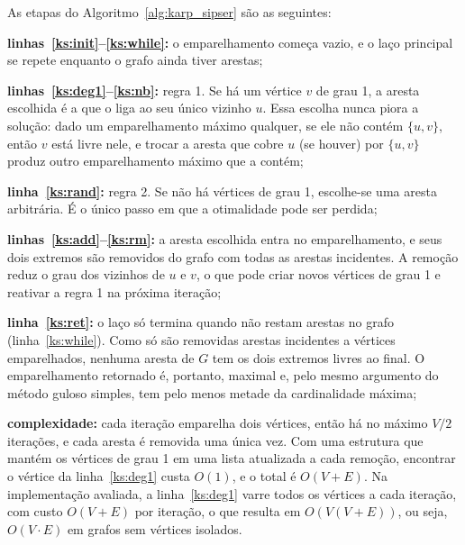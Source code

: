 As etapas do Algoritmo~\ref{alg:karp_sipser} são as seguintes:

\begin{alineas}
    \item \textbf{linhas~\ref{ks:init}--\ref{ks:while}:} o emparelhamento começa vazio, e o laço principal se repete enquanto o grafo ainda tiver arestas;
    \item \textbf{linhas~\ref{ks:deg1}--\ref{ks:nb}:} regra 1. Se há um vértice $v$ de grau 1, a aresta escolhida é a que o liga ao seu único vizinho $u$. Essa escolha nunca piora a solução: dado um emparelhamento máximo qualquer, se ele não contém $\{u, v\}$, então $v$ está livre nele, e trocar a aresta que cobre $u$ (se houver) por $\{u, v\}$ produz outro emparelhamento máximo que a contém;
    \item \textbf{linha~\ref{ks:rand}:} regra 2. Se não há vértices de grau 1, escolhe-se uma aresta arbitrária. É o único passo em que a otimalidade pode ser perdida;
    \item \textbf{linhas~\ref{ks:add}--\ref{ks:rm}:} a aresta escolhida entra no emparelhamento, e seus dois extremos são removidos do grafo com todas as arestas incidentes. A remoção reduz o grau dos vizinhos de $u$ e $v$, o que pode criar novos vértices de grau 1 e reativar a regra 1 na próxima iteração;
    \item \textbf{linha~\ref{ks:ret}:} o laço só termina quando não restam arestas no grafo (linha~\ref{ks:while}). Como só são removidas arestas incidentes a vértices emparelhados, nenhuma aresta de $G$ tem os dois extremos livres ao final. O emparelhamento retornado é, portanto, maximal e, pelo mesmo argumento do método guloso simples, tem pelo menos metade da cardinalidade máxima;
    \item \textbf{complexidade:} cada iteração emparelha dois vértices, então há no máximo $V/2$ iterações, e cada aresta é removida uma única vez. Com uma estrutura que mantém os vértices de grau 1 em uma lista atualizada a cada remoção, encontrar o vértice da linha~\ref{ks:deg1} custa $O(1)$, e o total é $O(V + E)$. Na implementação avaliada, a linha~\ref{ks:deg1} varre todos os vértices a cada iteração, com custo $O(V + E)$ por iteração, o que resulta em $O(V(V + E))$, ou seja, $O(V \cdot E)$ em grafos sem vértices isolados.
\end{alineas}

